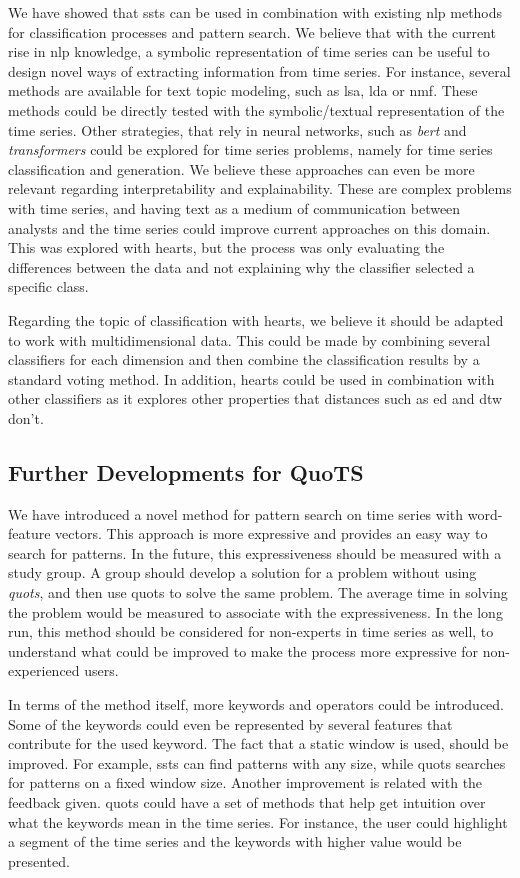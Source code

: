 We have showed that \gls{ssts} can be used in combination with existing \gls{nlp} methods for classification processes and pattern search. We believe that with the current rise in \gls{nlp} knowledge, a symbolic representation of time series can be useful to design novel ways of extracting information from time series. For instance, several methods are available for text topic modeling, such as \gls{lsa}, \gls{lda} or \gls{nmf}. These methods could be directly tested with the symbolic/textual representation of the time series. Other strategies, that rely in neural networks, such as \textit{bert} and \textit{transformers} could be explored for time series problems, namely for time series classification and generation. We believe these approaches can even be more relevant regarding interpretability and explainability. These are complex problems with time series, and having text as a medium of communication between analysts and the time series could improve current approaches on this domain. This was explored with \gls{hearts}, but the process was only evaluating the differences between the data and not explaining why the classifier selected a specific class.
\par
Regarding the topic of classification with \gls{hearts}, we believe it should be adapted to work with multidimensional data. This could be made by combining several classifiers for each dimension and then combine the classification results by a standard voting method. In addition, \gls{hearts} could be used in combination with other classifiers as it explores other properties that distances such as \gls{ed} and \gls{dtw} don't.

\subsection{Further Developments for QuoTS}

We have introduced a novel method for pattern search on time series with word-feature vectors. This approach is more expressive and provides an easy way to search for patterns. In the future, this expressiveness should be measured with a study group. A group should develop a solution for a problem without using \textit{quots}, and then use \gls{quots} to solve the same problem. The average time in solving the problem would be measured to associate with the expressiveness.  In the long run, this method should be considered for non-experts in time series as well, to understand what could be improved to make the process more expressive for non-experienced users.
\par
In terms of the method itself, more keywords and operators could be introduced. Some of the keywords could even be represented by several features that contribute for the used keyword. The fact that a static window is used, should be improved. For example, \gls{ssts} can find patterns with any size, while \gls{quots} searches for patterns on a fixed window size. Another improvement is related with the feedback given. \gls{quots} could have a set of methods that help get intuition over what the keywords mean in the time series. For instance, the user could highlight a segment of the time series and the keywords with higher value would be presented.